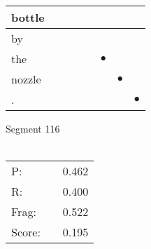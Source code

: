 \documentclass[landscape]{article}
\newcommand{\ssp}{\hspace{2pt}}
\newcommand{\mex}{\cellcolor{g}$\bullet$}
\begin{document}
\begin{tabular}{|l|p{10pt}|p{10pt}|p{10pt}|p{10pt}|p{10pt}|p{10pt}|p{10pt}|}
\hline
\ssp bottle \ssp&\hspace{2pt}&\hspace{2pt}&\hspace{2pt}&\hspace{2pt}&\hspace{2pt}&\hspace{2pt}&\hspace{2pt}\\
\hline
\ssp by \ssp&\hspace{2pt}&\hspace{2pt}&\hspace{2pt}&\hspace{2pt}&\hspace{2pt}&\hspace{2pt}&\hspace{2pt}\\
\hline
\ssp \cellcolor{ref4}the \ssp&\hspace{2pt}&\hspace{2pt}&\hspace{2pt}&\hspace{2pt}&\hspace{2pt}\mex&\hspace{2pt}&\hspace{2pt}\\
\hline
\ssp \cellcolor{ref5}nozzle \ssp&\hspace{2pt}&\hspace{2pt}&\hspace{2pt}&\hspace{2pt}&\hspace{2pt}&\hspace{2pt}\mex&\hspace{2pt}\\
\hline
\ssp \cellcolor{ref6}. \ssp&\hspace{2pt}&\hspace{2pt}&\hspace{2pt}&\hspace{2pt}&\hspace{2pt}&\hspace{2pt}&\hspace{2pt}\mex\\
\hline
\end{tabular}

\vspace{6pt}
\noindent Segment 116\\\\
\noindent\begin{tabular}{lm{12pt}r}
\hline
P:&&0.462\\
R:&&0.400\\
Frag:&&0.522\\
Score:&&0.195\\
\end{tabular}
\end{document}
